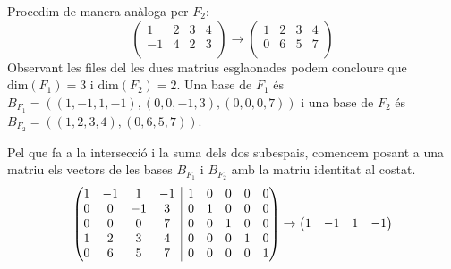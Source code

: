 \documentclass[11pt,a4paper]{article}
\newcommand{\rvline}{\hspace*{-\arraycolsep}\vline\hspace*{-\arraycolsep}}
\begin{document}
\begin{enumerate}
\begin{enumerate}
\begin{equation*}
        \end{equation*}
        Procedim de manera anàloga per $F_2$:
        \begin{equation*}
            \begin{pmatrix}
              1 & 2 & 3 & 4 \\
              -1 & 4 & 2 & 3 \\
           \end{pmatrix}\rightarrow\begin{pmatrix}
              1 & 2 & 3 & 4 \\
              0 & 6 & 5 & 7 \\
           \end{pmatrix}
        \end{equation*}
        Observant les files del les dues matrius esglaonades podem concloure que $\text{dim} (F_1)=3$ i $\text{dim} (F_2)=2$. Una base de $F_1$ és $B_{F_1}=((1,-1,1,-1),(0,0,-1,3),(0,0,0,7))$ i una base de $F_2$ és $B_{F_2}=((1,2,3,4),(0,6,5,7))$.\par Pel que fa a la intersecció i la suma dels dos subespais, comencem posant a una matriu els vectors de les bases $B_{F_1}$ i $B_{F_2}$ amb la matriu identitat al costat.
        \begin{multline*}
            \begin{pmatrix}
            \begin{matrix}
            1 & -1 & 1 & -1 \\
            0 & 0 & -1 & 3 \\
            0 & 0 & 0 & 7 \\
            1 & 2 & 3 & 4 \\
            0 & 6 & 5 & 7 \\
            \end{matrix} & \rvline & \begin{matrix}
            1 & 0 & 0 & 0 & 0  \\
            0 & 1 & 0 & 0 & 0  \\
            0 & 0 & 1 & 0 & 0  \\
            0 & 0 & 0 & 1 & 0  \\
            0 & 0 & 0 & 0 & 1 \\
            \end{matrix}
            \end{pmatrix}\rightarrow\begin{pmatrix}
            \begin{matrix}
            1 & -1 & 1 & -1 \\

\end{matrix}
\end{pmatrix}
\end{multline*}
\end{enumerate}
\end{enumerate}
\end{document}
